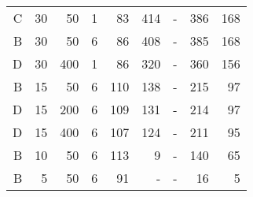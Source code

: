 \begin{table}[htbp]
\begin{center}
\begin{tabular}{rrrrrrrrr}
            C              & 30             & 50             & 1           & 83                    & 414                   & -                     & 386                   & 168                  \\
            B              & 30             & 50             & 6           & 86                    & 408                   & -                     & 385                   & 168                  \\
            D              & 30             & 400            & 1           & 86                    & 320                   & -                     & 360                   & 156                  \\
            B              & 15             & 50             & 6           & 110                   & 138                   & -                     & 215                   & 97                   \\
            D              & 15             & 200            & 6           & 109                   & 131                   & -                     & 214                   & 97                   \\
            D              & 15             & 400            & 6           & 107                   & 124                   & -                     & 211                   & 95                   \\
            B              & 10             & 50             & 6           & 113                   & 9                     & -                     & 140                   & 65                   \\
            B              & 5              & 50             & 6           & 91                    & -                     & -                     & 16                    & 5                    \\
            \hline
        \end{tabular}
    \end{center}
\end{table}
